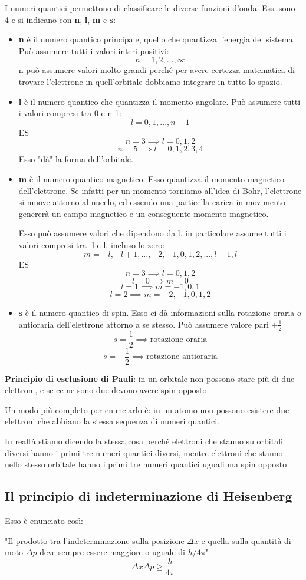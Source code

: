 I numeri quantici permettono di classificare le diverse funzioni d'onda. Essi sono 4 e si indicano con \textbf{n}, \textbf{l}, \textbf{m} e \textbf{s}:
\begin{itemize}
  \item \textbf{n} è il numero quantico principale, quello che quantizza l'energia del sistema.
  Può assumere tutti i valori interi positivi:
  $${n=1,2,...,\infty}$$
  n può assumere valori molto grandi perché per avere certezza matematica di trovare l'elettrone in quell'orbitale dobbiamo integrare in tutto lo spazio.
  \item \textbf{l} è il numero quantico che quantizza il momento angolare. Può assumere tutti i valori compresi tra 0 e n-1:
  $$l=0,1,...,n-1$$
  ES
  $$n=3 \implies l=0,1,2$$
  $$n=5 \implies l=0,1,2,3,4$$
  Esso "dà" la forma dell'orbitale.
  \item \textbf{m} è il numero quantico magnetico. Esso quantizza il momento magnetico dell'elettrone. Se infatti per un momento torniamo all'idea di Bohr, l'elettrone si muove attorno al nucelo, ed essendo una particella carica in movimento genererà un campo magnetico e un conseguente momento magnetico.
  
  Esso può assumere valori che dipendono da l. in particolare assume tutti i valori compresi tra -l e l, incluso lo zero:
  $$m=-l,-l+1,...,-2,-1,0,1,2,...,l-1,l$$
  ES 
  $$n=3 \implies l=0,1,2$$
  $$l=0 \implies m=0$$
  $$l=1 \implies m=-1,0,1$$
  $$l=2 \implies m=-2,-1,0,1,2$$
  \item \textbf{s} è il numero quantico di spin. Esso ci dà informazioni sulla rotazione oraria o antioraria dell'elettrone attorno a se stesso. Può assumere valore pari $\pm\frac{1}{2}$
  $$s=\frac{1}{2}\implies \text{rotazione oraria}$$
  $$s=-\frac{1}{2}\implies \text{rotazione antioraria}$$
\end{itemize}

\textbf{Principio di esclusione di Pauli}: in un orbitale non possono stare più di due elettroni, e se ce ne sono due devono avere spin opposto.

Un modo più completo per enunciarlo è: in un atomo non possono esistere due elettroni che abbiano la stessa sequenza di numeri quantici.

In realtà stiamo dicendo la stessa cosa perché elettroni che stanno su orbitali diversi hanno i primi tre numeri quantici diversi, mentre elettroni che stanno nello stesso orbitale hanno i primi tre numeri quantici uguali ma spin opposto
\subsection{Il principio di indeterminazione di Heisenberg}
Esso è enunciato così:

"Il prodotto tra l'indeterminazione sulla posizione $\Delta x$ e quella sulla quantità di moto $\Delta p$ deve sempre essere maggiore o uguale di $h/4\pi$"
$$\Delta x \Delta p \geq \frac{h}{4\pi}$$